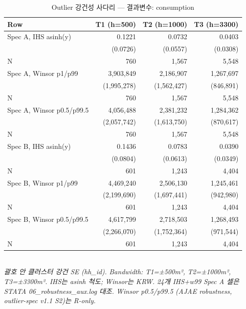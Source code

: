 \begin{table}[t]
\centering
\caption{Outlier 강건성 사다리 — 결과변수: consumption}
\label{tab:rob_outlier_consumption_ko}
\begin{tabular}{lrrr}
\toprule
Row & T1 (h=500) & T2 (h=1000) & T3 (h=3300) \\
\midrule
Spec A, IHS asinh(y) & 0.1221 & 0.0732 & 0.0403 \\
        & (0.0726) & (0.0557) & (0.0308) \\
N       & 760 & 1,567 & 5,548 \\
Spec A, Winsor p1/p99 & 3,903,849 & 2,186,907 & 1,267,697 \\
        & (1,995,278) & (1,562,427) & (846,891) \\
N       & 760 & 1,567 & 5,548 \\
Spec A, Winsor p0.5/p99.5 & 4,056,488 & 2,381,232 & 1,284,362 \\
        & (2,057,742) & (1,613,750) & (870,617) \\
N       & 760 & 1,567 & 5,548 \\
Spec B, IHS asinh(y) & 0.1436 & 0.0783 & 0.0390 \\
        & (0.0804) & (0.0613) & (0.0349) \\
N       & 601 & 1,243 & 4,404 \\
Spec B, Winsor p1/p99 & 4,469,240 & 2,506,130 & 1,245,461 \\
        & (2,199,690) & (1,697,441) & (942,980) \\
N       & 601 & 1,243 & 4,404 \\
Spec B, Winsor p0.5/p99.5 & 4,617,799 & 2,718,503 & 1,268,493 \\
        & (2,266,070) & (1,752,364) & (971,544) \\
N       & 601 & 1,243 & 4,404 \\
\bottomrule
\end{tabular}
\\
\footnotesize\textit{괄호 안 클러스터 강건 SE (hh_id). Bandwidth: T1=±500m², T2=±1000m², T3=±3300m². IHS는 asinh 척도; Winsor는 KRW. 24개 IHS+w99 Spec A 셀은 STATA 06_robustness_aux.log 대조. Winsor p0.5/p99.5 (AJAE robustness, outlier-spec v1.1 S2)는 R-only.}
\end{table}


